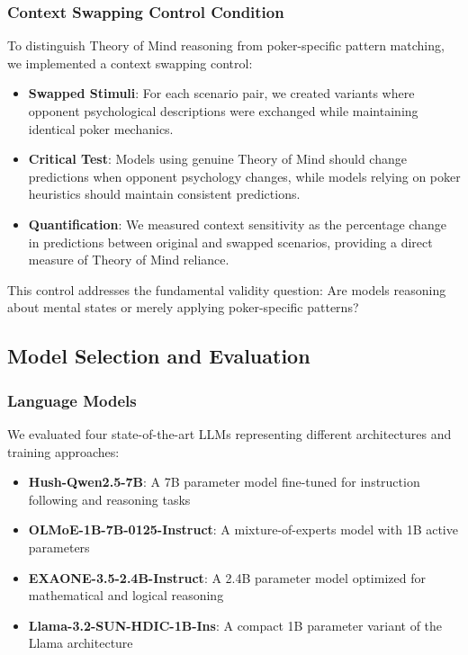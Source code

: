 \subsubsection{Context Swapping Control Condition}

To distinguish Theory of Mind reasoning from poker-specific pattern matching, we implemented a context swapping control:

\begin{itemize}
    \item \textbf{Swapped Stimuli}: For each scenario pair, we created variants where opponent psychological descriptions were exchanged while maintaining identical poker mechanics.
    
    \item \textbf{Critical Test}: Models using genuine Theory of Mind should change predictions when opponent psychology changes, while models relying on poker heuristics should maintain consistent predictions.
    
    \item \textbf{Quantification}: We measured context sensitivity as the percentage change in predictions between original and swapped scenarios, providing a direct measure of Theory of Mind reliance.
\end{itemize}

This control addresses the fundamental validity question: Are models reasoning about mental states or merely applying poker-specific patterns?

\subsection{Model Selection and Evaluation}
\label{subsec:model_evaluation}

\subsubsection{Language Models}

We evaluated four state-of-the-art LLMs representing different architectures and training approaches:

\begin{itemize}
    \item \textbf{Hush-Qwen2.5-7B}: A 7B parameter model fine-tuned for instruction following and reasoning tasks
    \item \textbf{OLMoE-1B-7B-0125-Instruct}: A mixture-of-experts model with 1B active parameters
    \item \textbf{EXAONE-3.5-2.4B-Instruct}: A 2.4B parameter model optimized for mathematical and logical reasoning  
    \item \textbf{Llama-3.2-SUN-HDIC-1B-Ins}: A compact 1B parameter variant of the Llama architecture
\end{itemize}

